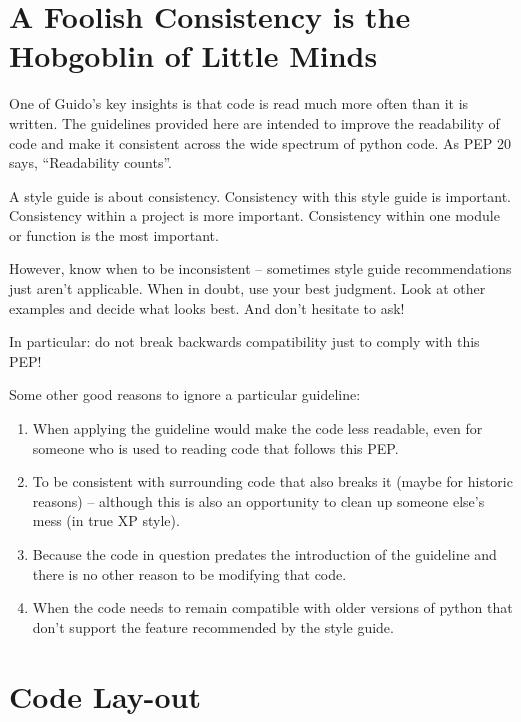 \documentclass[a4paper,11pt]{article}
\begin{document}
\section{A Foolish Consistency is the Hobgoblin of Little Minds}
One of Guido’s key insights is that code is read much more often than it is
written. The guidelines provided here are intended to improve the readability
of code and make it consistent across the wide spectrum of python code. As PEP
20 says, “Readability counts”.
\par
A style guide is about consistency. Consistency with this style guide is
important. Consistency within a project is more important. Consistency within
one module or function is the most important.
\par
However, know when to be inconsistent – sometimes style guide recommendations
just aren’t applicable. When in doubt, use your best judgment. Look at other
examples and decide what looks best. And don’t hesitate to ask!
\par
In particular: do not break backwards compatibility just to comply with this
PEP!
\par
Some other good reasons to ignore a particular guideline:
%
\begin{enumerate}
\item When applying the guideline would make the code less readable, even for
someone who is used to reading code that follows this PEP.
\item To be consistent with surrounding code that also breaks it (maybe for
historic reasons) – although this is also an opportunity to clean up someone
else’s mess (in true XP style).
\item Because the code in question predates the introduction of the guideline
and there is no other reason to be modifying that code.
\item When the code needs to remain compatible with older versions of python
that don’t support the feature recommended by the style guide.
\end{enumerate}
%
\section{Code Lay-out}
\end{document}
